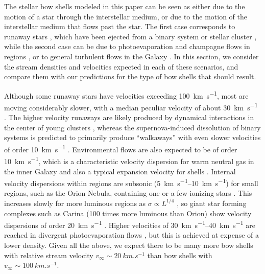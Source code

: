 The stellar bow shells modeled in this paper can be seen as either due to
the motion of a star through the interstellar medium, or due to the
motion of the interstellar medium that flows past the star.  The
first case corresponds to runaway stars \citep{Blaauw:1961a}, which
have been ejected from a binary system or stellar cluster
\citep{Hoogerwerf:2001a}, while the second case can be due to
photoevaporation and champagne flows in \hii{} regions
\citep{Tenorio-Tagle:1979a, Shu:2002a, Henney:2005a}, or to general
turbulent flows in the Galaxy
\citep[e.g.,][]{Ballesteros-Paredes:1999a}.  In this section, we
consider the stream densities and velocities expected in each of these
scenarios, and compare them with our predictions for the type of bow shells
that should result.

Although some runaway stars have velocities exceeding
\SI{100}{km.s^{-1}}, most are moving considerably slower, with a
median peculiar velocity of about \SI{30}{km.s^{-1}}
\citep{Tetzlaff:2011a}.  The higher velocity runaways are likely
produced by dynamical interactions in the center of young clusters
\citep{Gualandris:2004a}, whereas the supernova-induced dissolution of
binary systems is predicted to primarily produce ``walkaways'' with
even slower velocities of order \SI{10}{km.s^{-1}}
\citep{Renzo:2018a}.  Environmental flows are also expected to be of
order \SI{10}{km.s^{-1}}, which is a characteristic velocity
dispersion for warm neutral gas in the inner Galaxy
\citep{Marasco:2017a} and also a typical expansion velocity for
 shells \citep{Ehlerova:2005a}.  Internal velocity
dispersions within \hii{} regions are subsonic
(\SIrange{5}{10}{km.s^{-1}}) for small regions, such as the Orion
Nebula, containing one or a few ionizing stars
\citep{Arthur:2016a}. This increases slowly for more luminous regions
as \(\sigma \propto L^{1/4}\) \citep{Bordalo:2011a}, so giant star forming
complexes such as Carina (100 times more luminous than Orion) show
velocity dispersions of order \SI{20}{km.s^{-1}}
\citep{Damiani:2016a}.  Higher velocities of
\SIrange{30}{40}{km.s^{-1}} are reached in divergent photoevaporation
flows \citep{Dyson:1968a}, but this is achieved at expense of a lower
density.  Given all the above, we expect there to be many more bow shells
with relative stream velocity \(v_\infty \sim \SI{20}{km.s^{-1}}\) than bow shells
with \(v_\infty \sim \SI{100}{km.s^{-1}}\).

